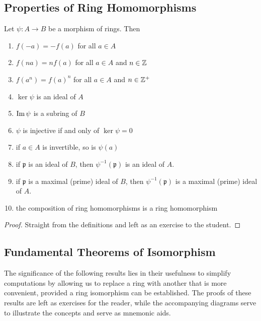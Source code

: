 \documentclass[11pt,a4paper]{article}
\begin{document}
\subsection{Properties of Ring Homomorphisms}

\begin{prop}
Let \(\psi\colon A\to B\) be a morphism of rings.
Then
\begin{enumerate}[label=(\roman*)]
\item \( f(-a) = -f(a) \) for all \(a\in A\)
\item \( f(na) = nf(a) \)  for all \(a\in A\) and \(n\in \mathbb{Z}\)
\item \( f(a^n) = f(a)^n \)  for all \(a\in A\) and \(n\in \mathbb{Z}^+\)

\item \(\ker \psi \) is an ideal of \(A\)
\item \(\operatorname{Im} \psi\) is a subring of \(B\)
\item \(\psi\) is injective if and only of \(\ker \psi = 0\)
\item if \(a\in A\) is invertible, so is \(\psi(a)\)
\item if \(\mathfrak{p}\) is an ideal of \(B\), then \(\psi^{-1}(\mathfrak{p})\) is an ideal of \(A\).
\item if \(\mathfrak{p}\) is a maximal (prime) ideal of \(B\), then \(\psi^{-1}(\mathfrak{p})\) is a maximal (prime) ideal of \(A\).
\item the composition of ring homomorphisms is a ring homomorphism
\end{enumerate}
\end{prop}

\begin{proof}
    Straight from the definitions and left as an exercise to the student.
\end{proof}

\pagebreak
\subsection{Fundamental Theorems of Isomorphism}

 

The significance of the following results lies in their usefulness  to simplify computations by allowing us to replace a ring with another that is more convenient, provided a ring isomorphism can be established. The proofs of these results are left as exercises for the reader, while the accompanying diagrams serve to illustrate the concepts and serve as mnemonic aids.
\end{document}
